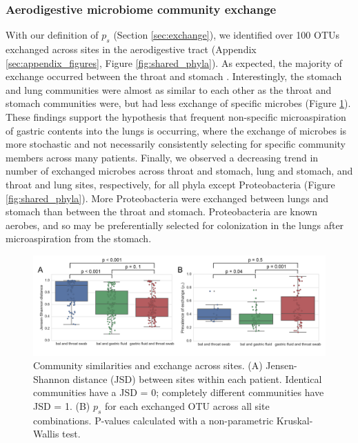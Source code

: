 \documentclass[12pt]{article}
\begin{document}
\subsubsection{Aerodigestive microbiome community exchange}

With our definition of $p_s$ (Section \ref{sec:exchange}), we identified over 100
OTUs exchanged across sites in the aerodigestive tract (Appendix \ref{sec:appendix_figures}, Figure \ref{fig:shared_phyla}).
As expected, the majority of exchange occurred between the throat and stomach \cite{bassis-source-2015}.
Interestingly, the stomach and lung communities were almost as similar to
each other as the throat and stomach communities were,
but had less exchange of specific microbes (Figure \ref{fig:similarities}). 
These findings support the hypothesis that frequent non-specific microaspiration
of gastric contents into the lungs is occurring,
where the exchange of microbes is more stochastic and
not necessarily consistently selecting for specific community members across many patients.
Finally, we observed a decreasing trend in number of exchanged microbes 
across throat and stomach, lung and stomach, and throat and lung sites, respectively, 
for all phyla except Proteobacteria (Figure \ref{fig:shared_phyla}). More Proteobacteria were exchanged 
between lungs and stomach than between the throat and stomach. Proteobacteria are 
known aerobes, and so may be preferentially selected for colonization in 
the lungs after microaspiration from the stomach.

\begin{figure}[h]
\begin{center}
	\includegraphics[scale=0.6]{all_jsd_sharedness}
	\caption{Community similarities and exchange across sites.
	(A) Jensen-Shannon distance (JSD) between sites within each patient. 
	Identical communities have a JSD = 0; completely different
	communities have JSD = 1. (B) $p_s$ for each exchanged OTU across 
	all site combinations. P-values calculated with a
	non-parametric Kruskal-Wallis test.}
	\label{fig:similarities}
\end{center}
\end{figure}
\end{document}
